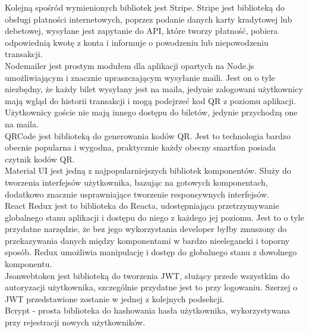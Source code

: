 \documentclass[12pt]{article}
\begin{document}
\begin{sloppypar}
{{    Kolejną spośród wymienionych bibliotek jest Stripe. Stripe jest biblioteką do obsługi płatności internetowych, poprzez podanie danych karty kradytowej lub debetowej, 
    wysyłane jest zapytanie do API, które tworzy płatność, pobiera odpowiednią kwotę z konta i informuje o powodzeniu lub niepowodzeniu transakcji.\\
 
    Nodemailer jest prostym modułem dla aplikacji opartych na Node.js umożliwiającym i znacznie upraszczającym wysyłanie maili. Jest on o tyle niezbędny, że każdy bilet wysyłany jest na maila, 
    jedynie zalogowani użytkownicy mają wgląd do historii transakcji i mogą podejrzeć kod QR z poziomu aplikacji. Użytkownicy goście nie mają innego dostępu do biletów, jedynie 
    przychodzą one na maila.\\
 
    QRCode jest biblioteką do generowania kodów QR. Jest to technologia bardzo obecnie popularna i wygodna, praktycznie każdy obecny smartfon posiada czytnik kodów QR.\\
 
    Material UI jest jedną z najpopularniejszych bibliotek komponentów. Służy do tworzenia interfejsów użytkownika, bazując na gotowych komponentach, dodatkowo znacznie 
    usprawniające tworzenie responsywnych interfejsów.\\
 
    React Redux jest to biblioteka do Reacta, udostępniająca przetrzymywanie globalnego stanu aplikacji i dostępu do niego z każdego jej poziomu. Jest to o tyle przydatne 
    narzędzie, że bez jego wykorzystania developer byłby zmuszony do przekazywania danych między komponentami w bardzo nieelegancki i toporny sposób. Redux umożliwia 
    manipulację i dostęp do globalnego stanu z dowolnego komponentu.\\
 
    Jsonwebtoken jest biblioteką do tworzenia JWT, służący przede wszystkim do autoryzacji użytkownika, szczególnie przydatne jest to przy logowaniu. Szerzej o JWT 
    przedstawione zostanie w jednej z kolejnych podsekcji.\\
 
    Bcrypt - prosta biblioteka do hashowania hasła użytkownika, wykorzystywana przy rejestracji nowych użytkowników.
  }
}
\end{sloppypar}
\end{document}
